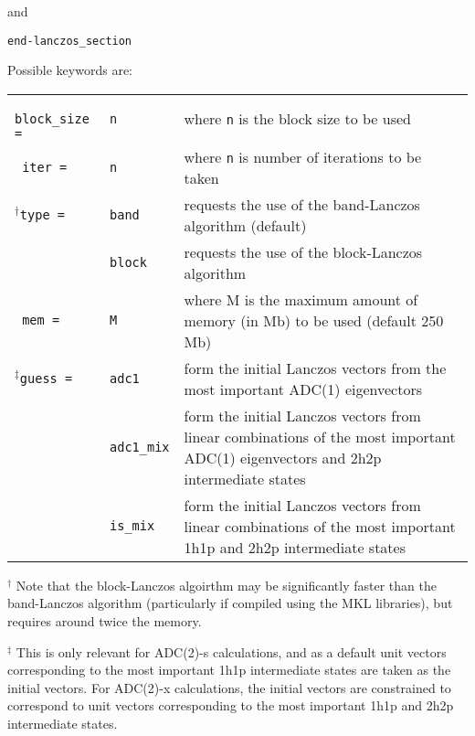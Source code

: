\documentclass[12pt]{article}
\newcommand*\code[1]{\mbox{\texttt{{#1}}}} %
\begin{document}
\vspace{0.2cm}
\noindent
and

\vspace{0.2cm}
\code{end-lanczos\_section}

\vspace{0.2cm}
\noindent
Possible keywords are:

\begin{table}[h]
\vspace*{1.7ex}
\begin{center}
\begin{tabular}{llp{2.5in}}
\code{ block\_size =} & \code{n} & where \code{n} is the block size to be used \\
\vspace{0.2cm}
\code{ iter =} & \code{n} & where \code{n} is number of iterations to be taken \\
\vspace{0.2cm}
$^{\dagger}$\code{type =} & \code{band} & requests the use of the band-Lanczos algorithm (default) \\
              & \code{block} & requests the use of the block-Lanczos algorithm \\
\vspace{0.2cm}
\code{ mem =} & \code{M} & where M is the maximum amount of memory (in Mb) to be used (default 250 Mb) \\
\vspace{0.2cm}
$^{\ddagger}$\code{guess =} & \code{adc1} & form the initial Lanczos vectors from the most important ADC(1) eigenvectors \\
               & \code{adc1\_mix} & form the initial Lanczos vectors from linear combinations of the most important ADC(1) eigenvectors and 2h2p intermediate states\\
               & \code{is\_mix} & form the initial Lanczos vectors from linear combinations of the most important 1h1p and 2h2p intermediate states \\
\end{tabular}
\end{center}
\end{table}

\vspace{0.2cm}
\noindent
$^{\dagger}$ Note that the block-Lanczos algoirthm may be significantly faster than
the band-Lanczos algorithm (particularly if compiled using the MKL
libraries), but requires around twice the memory.

\vspace{0.4cm}
\noindent
$^{\ddagger}$ This is only relevant for ADC(2)-s calculations, and as
a default unit vectors corresponding to the most important 1h1p
intermediate states are taken as the initial vectors. For ADC(2)-x
calculations, the initial vectors are constrained to correspond to
unit vectors corresponding to the most important 1h1p and 2h2p
intermediate states.
\end{document}
